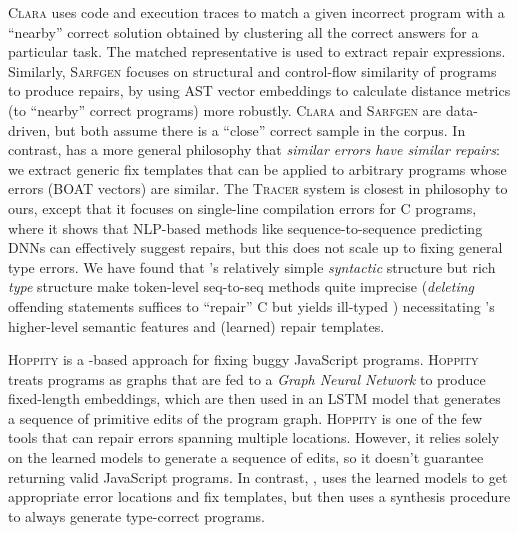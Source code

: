 %
\textsc{Clara} \citep{Gulwani_2018} uses code and execution traces to match a
given incorrect program with a ``nearby'' correct solution obtained by
clustering all the correct answers for a particular task. The matched
representative is used to extract repair expressions.
%
Similarly, \textsc{Sarfgen} \citep{Wang_2018} focuses on structural and
control-flow similarity of programs to produce repairs, by using AST vector
embeddings to calculate distance metrics (to ``nearby'' correct
programs) more robustly.
%
\textsc{Clara} and \textsc{Sarfgen} are data-driven, but both assume
there is a ``close'' correct sample in the corpus.
%
In contrast, \toolname has a more general philosophy that \emph{similar errors
have similar repairs}: we extract generic fix templates that can be applied to
arbitrary programs whose errors (BOAT vectors) are similar.
%
The \textsc{Tracer} system \citep{TRACER2018} is closest in philosophy to ours,
except that it focuses on single-line compilation errors for C programs, where
it shows that NLP-based methods like sequence-to-sequence predicting DNNs can
effectively suggest repairs, %
but this does not scale up to fixing general type errors.
%
We have found that \ocaml's relatively simple
\emph{syntactic} structure but rich \emph{type}
structure make token-level seq-to-seq methods 
quite imprecise (\eg \emph{deleting} offending 
statements suffices to ``repair'' C but yields
ill-typed \ocaml) necessitating \toolname's 
higher-level semantic features and (learned) 
repair templates.

\textsc{Hoppity} \citep{Dinella_2020} is 
a \dnn-based approach for fixing buggy 
JavaScript programs. \textsc{Hoppity} 
treats programs as graphs that are fed 
to a \emph{Graph Neural Network} to 
produce fixed-length embeddings, which 
are then used in an LSTM model that 
generates a sequence of primitive
edits of the program graph. 
%
\textsc{Hoppity} is one of the few tools 
that can repair errors spanning multiple 
locations. However, it relies solely on 
the learned models to generate a sequence 
of edits, so it doesn't guarantee returning 
valid JavaScript programs.
%
In contrast, \toolname, uses the learned 
models to get appropriate error locations 
and fix templates, but then uses a synthesis 
procedure to always generate type-correct programs.

